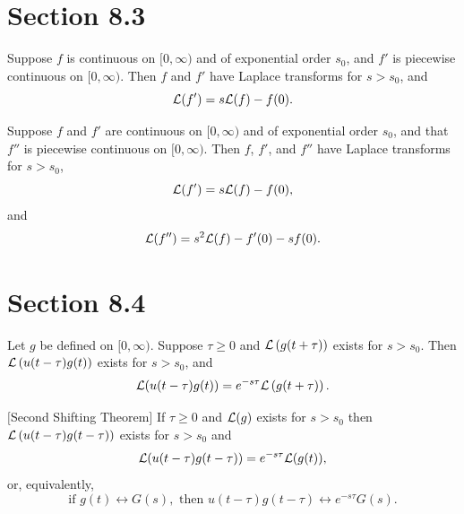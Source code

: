 \section*{Section 8.3}
\setcounter{chapter}{8}
\setcounter{section}{3}

\setcounter{theorem}{0}
\setcounter{equation}{0}
\begin{theorem}
  \label{thmtype:8.3.1} Suppose $f$ is continuous on $[0,\infty)$ and of exponential order $s_{0}$,
  and $f'$ is piecewise continuous on $[0,\infty)$. Then $f$ and $f'$ have Laplace transforms for
  $s>s_{0}$, and
  \begin{equation}
    \label{eq:8.3.1}{\cal L}(f')=s{\cal L}(f)-f(0).
  \end{equation}
\end{theorem}

\setcounter{theorem}{1}
\setcounter{equation}{3}
\begin{theorem}
  \label{thmtype:8.3.2} Suppose $f$ and $f'$ are continuous on $[0,\infty)$ and of exponential order
  $s_{0}$, and that $f''$ is piecewise continuous on $[0,\infty)$. Then $f$, $f'$, and $f''$ have
  Laplace transforms for $s >s_{0}$,
  \begin{equation}
    \label{eq:8.3.4}{\cal L}(f')=s{\cal L}(f)-f(0),
  \end{equation}
  and
  \begin{equation}
    \label{eq:8.3.5}{\cal L}(f'')=s^{2}{\cal L}(f)-f'(0)-sf(0).
  \end{equation}
\end{theorem}

\section*{Section 8.4}
\setcounter{chapter}{8}
\setcounter{section}{4}

\setcounter{theorem}{0}
\begin{theorem}
  \label{thmtype:8.4.1} Let $g$ be defined on $[0,\infty)$. Suppose $\tau\ge0$ and
  ${\cal L}\left(g(t+\tau)\right)$ exists for $s>s_{0}$. Then ${\cal L}\left(u(t-\tau)g(t)\right)$
  exists for $s>s_{0}$, and
  \[
    {\cal L}(u(t-\tau)g(t))=e^{-s\tau}{\cal L}\left(g(t+\tau)\right).
  \]
\end{theorem}

\setcounter{theorem}{1}
\setcounter{equation}{11}
\begin{theorem}
  $[$Second Shifting Theorem$]$\label{thmtype:8.4.2} If $\tau\ge0$ and ${\cal L}(g)$ exists for
  $s>s_{0}$ then ${\cal L}\left(u(t-\tau)g(t-\tau)\right)$ exists for $s>s_{0}$ and
  \[
    {\cal L}(u(t-\tau)g(t-\tau))=e^{-s\tau}{\cal L}(g(t)),
  \]
  or, equivalently,
  \begin{equation}
    \label{eq:8.4.12}\mbox{if }g(t)\leftrightarrow G(s),\mbox{ then }u(t-\tau)g(t-\tau)\leftrightarrow e^{-s\tau}G(s).
  \end{equation}
\end{theorem}


